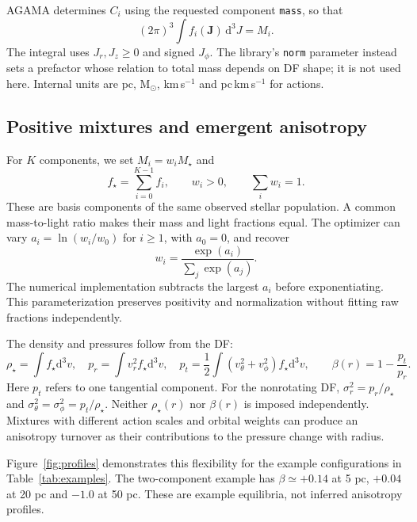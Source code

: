 \documentclass[11pt,a4paper]{article}
\newcommand{\Msun}{\mathrm{M}_{\odot}}
\newcommand{\dd}{\mathrm{d}}
\begin{document}
AGAMA determines $C_i$ using the requested component \texttt{mass}, so that
\begin{equation}
 (2\pi)^3\int f_i(\boldsymbol J)\,\dd^3J=M_i.
 \label{eq:massnorm}
\end{equation}
The integral uses $J_r,J_z\geq0$ and signed $J_\phi$. The library's
\texttt{norm} parameter instead sets a prefactor whose relation to total mass
depends on DF shape; it is not used here. Internal units are pc, $\Msun$,
km\,s$^{-1}$ and pc\,km\,s$^{-1}$ for actions.

\subsection{Positive mixtures and emergent anisotropy}

For $K$ components, we set $M_i=w_iM_\star$ and
\begin{equation}
 f_\star=\sum_{i=0}^{K-1} f_i,\qquad w_i>0,\qquad \sum_iw_i=1.
\end{equation}
These are basis components of the same observed stellar population. A common
mass-to-light ratio makes their mass and light fractions equal. The optimizer
can vary $a_i=\ln(w_i/w_0)$ for $i\geq1$, with $a_0=0$, and recover
\begin{equation}
 w_i=\frac{\exp(a_i)}{\sum_j\exp(a_j)}.
 \label{eq:softmax}
\end{equation}
The numerical implementation subtracts the largest $a_i$ before exponentiating.
This parameterization preserves positivity and normalization without fitting
raw fractions independently.

The density and pressures follow from the DF:
\begin{equation}
 \rho_\star=\int f_\star\dd^3v,\quad
 p_r=\int v_r^2 f_\star\dd^3v,\quad
 p_t=\frac12\int(v_\theta^2+v_\phi^2)f_\star\dd^3v,
 \qquad \beta(r)=1-\frac{p_t}{p_r}.
 \label{eq:moments}
\end{equation}
Here $p_t$ refers to one tangential component. For the nonrotating DF,
$\sigma_r^2=p_r/\rho_\star$ and $\sigma_\theta^2=\sigma_\phi^2=p_t/\rho_\star$.
Neither $\rho_\star(r)$ nor $\beta(r)$ is imposed independently. Mixtures with
different action scales and orbital weights can produce an anisotropy
turnover as their contributions to the pressure change with radius.

Figure~\ref{fig:profiles} demonstrates this flexibility for the example
configurations in Table~\ref{tab:examples}. The two-component example has
$\beta\simeq+0.14$ at 5 pc, $+0.04$ at 20 pc and $-1.0$ at 50 pc.
These are example equilibria, not inferred anisotropy profiles.
\end{document}
